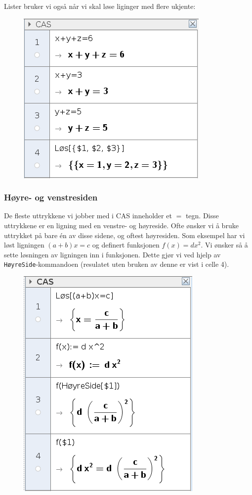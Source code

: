 Lister bruker vi også når vi skal løse liginger med flere ukjente:
\begin{figure}
	\centering
	\includegraphics[scale=0.5]{fig/lign}
\end{figure}
\subsubsection{Høyre- og venstresiden \label{hogl}}
De fleste uttrykkene vi jobber med i CAS inneholder et $ = $ tegn. Disse uttrykkene er en ligning med en venstre- og høyreside. Ofte ønsker vi å bruke uttrykket på bare én av disse sidene, og oftest høyresiden. Som eksempel har vi løst ligningen $ (a+b)x = c $ og definert funksjonen $ f(x)= d x^2 $. Vi ønsker så å sette løsningen av ligningen inn i funksjonen. Dette gjør vi ved hjelp av \texttt{HøyreSide}-kommandoen (resulatet uten bruken av denne er vist i celle 4).
\begin{figure}
	\centering
	\includegraphics[scale=0.5]{fig/hoyre}
\end{figure}
